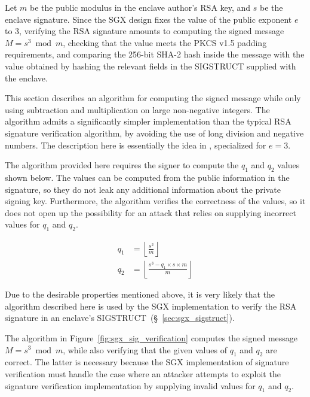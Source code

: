 \label{sec:sgx_rsa_check}

Let $m$ be the public modulus in the enclave author's RSA key, and $s$ be the
enclave signature. Since the SGX design fixes the value of the public exponent
$e$ to $3$, verifying the RSA signature amounts to computing the signed
message $M = s^3 \bmod m$, checking that the value meets the PKCS v1.5 padding
requirements, and comparing the 256-bit SHA-2 hash inside the message with the
value obtained by hashing the relevant fields in the SIGSTRUCT supplied with
the enclave.

This section describes an algorithm for computing the signed message while only
using subtraction and multiplication on large non-negative integers. The
algorithm admits a significantly simpler implementation than the typical RSA
signature verification algorithm, by avoiding the use of long division and
negative numbers. The description here is essentially the idea in
\cite{gueron2011rsasig}, specialized for $e = 3$.


The algorithm provided here requires the signer to compute the $q_1$ and
$q_2$ values shown below. The values can be computed from the public
information in the signature, so they do not leak any additional information
about the private signing key. Furthermore, the algorithm verifies the
correctness of the values, so it does not open up the possibility for an attack
that relies on supplying incorrect values for $q_1$ and $q_2$.

\begin{align*}
q_1 & = \left\lfloor \frac{s^2}{m} \right\rfloor \\
q_2 & = \left\lfloor \frac{s^3 - q_1 \times s \times m}{m} \right\rfloor
\end{align*}

Due to the desirable properties mentioned above, it is very likely that the
algorithm described here is used by the SGX implementation to verify the RSA
signature in an enclave's SIGSTRUCT~(\S~\ref{sec:sgx_sigstruct}).

The algorithm in Figure~\ref{fig:sgx_sig_verification} computes the signed
message $M = s^3 \bmod m$, while also verifying that the given values of $q_1$
and $q_2$ are correct. The latter is necessary because the SGX implementation
of signature verification must handle the case where an attacker attempts to
exploit the signature verification implementation by supplying invalid values
for $q_1$ and $q_2$.

